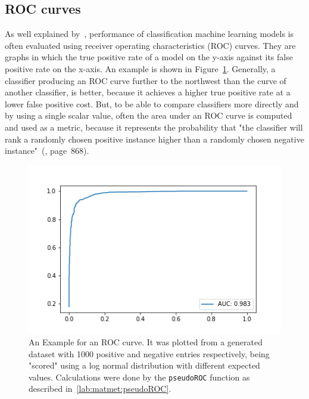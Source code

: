 	\subsection{ROC curves}
	\label{lab:background:roc}
	As well explained by~\citet{Fawcett2006}, performance of classification machine learning models is often evaluated using receiver operating characteristics (ROC) curves. They are graphs in which the true positive rate of a model on the y-axis against its false positive rate on the x-axis. An example is shown in Figure~\ref{fig:roc_example}. Generally, a classifier producing an ROC curve further to the northwest than the curve of another classifier,	is better, because it achieves a higher true positive rate at a lower false positive cost. But, to be able to compare classifiers more directly and by using a single scalar value, often the area under an ROC curve is computed and used as a metric, because it represents the probability that "the classifier will rank a randomly chosen positive instance higher than a randomly chosen negative instance"~(\cite{Fawcett2006}, page~868).
	\renewcommand{\baselinestretch}{0.9}
	\begin{figure}
		\normalsize
		\centering
		\includegraphics[width = \textwidth]{figures/ROC.png}
		\caption[Example for an ROC curve]{An Example for an ROC curve. It was plotted from a generated dataset with 1000 positive and negative entries respectively, being "scored" using a log normal distribution with different expected values. Calculations were done by the \texttt{pseudoROC} function as described in~\ref{lab:matmet:pseudoROC}.}
		\label{fig:roc_example}
	\end{figure}
	\renewcommand{\baselinestretch}{1}\\
